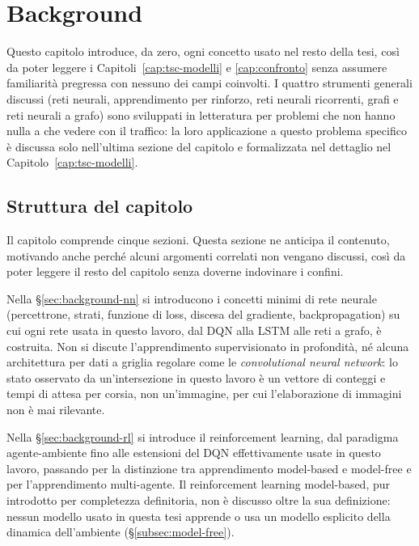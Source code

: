 \chapter{Background}
\label{cap:background}

Questo capitolo introduce, da zero, ogni concetto usato nel resto della
tesi, così da poter leggere i Capitoli~\ref{cap:tsc-modelli} e
\ref{cap:confronto} senza assumere familiarità pregressa con nessuno dei
campi coinvolti. I quattro strumenti generali discussi (reti neurali,
apprendimento per rinforzo, reti neurali ricorrenti, grafi e reti neurali a
grafo) sono sviluppati in letteratura per problemi che non hanno nulla a
che vedere con il traffico: la loro applicazione a questo problema
specifico è discussa solo nell'ultima sezione del capitolo e formalizzata
nel dettaglio nel Capitolo~\ref{cap:tsc-modelli}.

\section{Struttura del capitolo}
\label{sec:background-overview}

Il capitolo comprende cinque sezioni. Questa sezione ne anticipa il
contenuto, motivando anche perché alcuni argomenti correlati non vengano
discussi, così da poter leggere il resto del capitolo senza doverne
indovinare i confini.

Nella §\ref{sec:background-nn} si introducono i concetti minimi di rete
neurale (percettrone, strati, funzione di loss, discesa del gradiente,
backpropagation) su cui ogni rete usata in questo lavoro, dal DQN alla
LSTM alle reti a grafo, è costruita. Non si discute l'apprendimento
supervisionato in profondità, né alcuna architettura per dati a griglia
regolare come le \emph{convolutional neural network}: lo stato osservato
da un'intersezione in questo lavoro è un vettore di conteggi e tempi di
attesa per corsia, non un'immagine, per cui l'elaborazione di immagini non
è mai rilevante.

Nella §\ref{sec:background-rl} si introduce il reinforcement learning,
dal paradigma agente-ambiente fino alle estensioni del DQN effettivamente
usate in questo lavoro, passando per la distinzione tra apprendimento
model-based e model-free e per l'apprendimento multi-agente. Il
reinforcement learning model-based, pur introdotto per completezza
definitoria, non è discusso oltre la sua definizione: nessun modello
usato in questa tesi apprende o usa un modello esplicito della dinamica
dell'ambiente (§\ref{subsec:model-free}).

